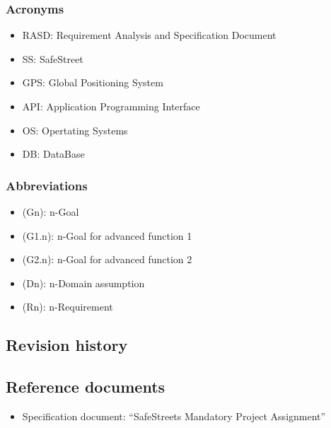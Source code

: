 \subsubsection{Acronyms}
\begin{itemize}
	\item RASD: Requirement Analysis and Specification Document
	\item SS: SafeStreet
	\item GPS: Global Positioning System
	\item API: Application Programming Interface
	\item OS: Opertating Systems
	\item DB: DataBase 
	\end{itemize}
\subsubsection{Abbreviations}
\begin{itemize}
	\item(Gn): n-Goal 
	\item(G1.n): n-Goal for advanced function 1 
	\item(G2.n): n-Goal for advanced function 2 
	\item(Dn): n-Domain assumption 
	\item(Rn): n-Requirement 
\end{itemize}
\subsection{Revision history}
\subsection{Reference documents}
\begin{itemize}
	\item Specification document: “SafeStreets Mandatory Project Assignment” 
\end{itemize}
